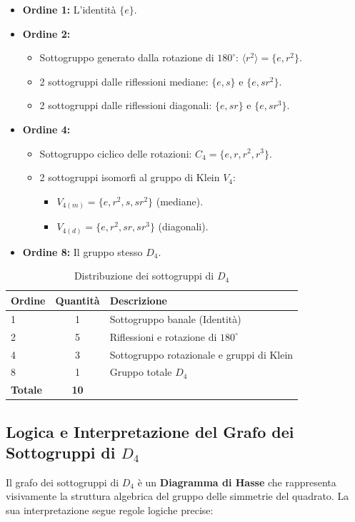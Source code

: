 \begin{itemize}
    \item \textbf{Ordine 1:} L'identità $\{e\}$.
    \item \textbf{Ordine 2:}
    \begin{itemize}
        \item Sottogruppo generato dalla rotazione di $180^\circ$: $\langle r^2 \rangle = \{e, r^2\}$.
        \item 2 sottogruppi dalle riflessioni mediane: $\{e, s\}$ e $\{e, sr^2\}$.
        \item 2 sottogruppi dalle riflessioni diagonali: $\{e, sr\}$ e $\{e, sr^3\}$.
    \end{itemize}
    \item \textbf{Ordine 4:}
    \begin{itemize}
        \item Sottogruppo ciclico delle rotazioni: $C_4 = \{e, r, r^2, r^3\}$.
        \item 2 sottogruppi isomorfi al gruppo di Klein $V_4$:
        \begin{itemize}
            \item $V_{4(m)} = \{e, r^2, s, sr^2\}$ (mediane).
            \item $V_{4(d)} = \{e, r^2, sr, sr^3\}$ (diagonali).
        \end{itemize}
    \end{itemize}
    \item \textbf{Ordine 8:} Il gruppo stesso $D_4$.
\end{itemize}

\begin{table}[h]
\centering
\begin{tabular}{lcl}
\toprule
\textbf{Ordine} & \textbf{Quantità} & \textbf{Descrizione} \\
\midrule
1 & 1 & Sottogruppo banale (Identità) \\
2 & 5 & Riflessioni e rotazione di $180^\circ$ \\
4 & 3 & Sottogruppo rotazionale e gruppi di Klein \\
8 & 1 & Gruppo totale $D_4$ \\
\midrule
\textbf{Totale} & \textbf{10} & \\
\bottomrule
\end{tabular}
\caption{Distribuzione dei sottogruppi di $D_4$}
\end{table}

\subsection{Logica e Interpretazione del Grafo dei Sottogruppi di $D_4$}
Il grafo dei sottogruppi di $D_4$ è un \textbf{Diagramma di Hasse} che rappresenta visivamente la struttura algebrica del gruppo delle simmetrie del quadrato.
La sua interpretazione segue regole logiche precise:

